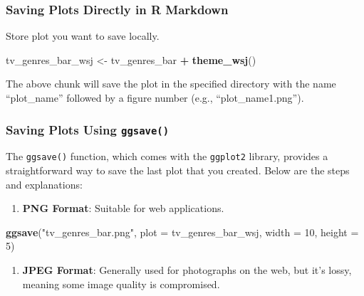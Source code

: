 \documentclass[
]{book}
\newenvironment{Shaded}{\begin{snugshade}}{\end{snugshade}}
\newcommand{\AttributeTok}[1]{\textcolor[rgb]{0.13,0.29,0.53}{#1}}
\newcommand{\DecValTok}[1]{\textcolor[rgb]{0.00,0.00,0.81}{#1}}
\newcommand{\FunctionTok}[1]{\textcolor[rgb]{0.13,0.29,0.53}{\textbf{#1}}}
\newcommand{\NormalTok}[1]{#1}
\newcommand{\OtherTok}[1]{\textcolor[rgb]{0.56,0.35,0.01}{#1}}
\newcommand{\SpecialCharTok}[1]{\textcolor[rgb]{0.81,0.36,0.00}{\textbf{#1}}}
\newcommand{\StringTok}[1]{\textcolor[rgb]{0.31,0.60,0.02}{#1}}
\providecommand{\tightlist}{%
  \setlength{\itemsep}{0pt}\setlength{\parskip}{0pt}}
\begin{document}
\hypertarget{saving-plots-directly-in-r-markdown}{%
\subsubsection*{Saving Plots Directly in R Markdown}\label{saving-plots-directly-in-r-markdown}}

Store plot you want to save locally.

\begin{Shaded}
\begin{Highlighting}[]
\NormalTok{tv\_genres\_bar\_wsj }\OtherTok{\textless{}{-}}\NormalTok{ tv\_genres\_bar }\SpecialCharTok{+}
  \FunctionTok{theme\_wsj}\NormalTok{()}
\end{Highlighting}
\end{Shaded}

The above chunk will save the plot in the specified directory with the name ``plot\_name'' followed by a figure number (e.g., ``plot\_name1.png'').

\hypertarget{saving-plots-using-ggsave}{%
\subsubsection*{\texorpdfstring{Saving Plots Using \texttt{ggsave()}}{Saving Plots Using ggsave()}}\label{saving-plots-using-ggsave}}

The \texttt{ggsave()} function, which comes with the \texttt{ggplot2} library, provides a straightforward way to save the last plot that you created. Below are the steps and explanations:

\begin{enumerate}
\def\labelenumi{\arabic{enumi}.}
\tightlist
\item
  \textbf{PNG Format}: Suitable for web applications.
\end{enumerate}

\begin{Shaded}
\begin{Highlighting}[]
\FunctionTok{ggsave}\NormalTok{(}\StringTok{"tv\_genres\_bar.png"}\NormalTok{, }\AttributeTok{plot =}\NormalTok{ tv\_genres\_bar\_wsj, }\AttributeTok{width =} \DecValTok{10}\NormalTok{, }\AttributeTok{height =} \DecValTok{5}\NormalTok{)}
\end{Highlighting}
\end{Shaded}

\begin{enumerate}
\def\labelenumi{\arabic{enumi}.}
\setcounter{enumi}{1}
\tightlist
\item
  \textbf{JPEG Format}: Generally used for photographs on the web, but it's lossy, meaning some image quality is compromised.
\end{enumerate}
\end{document}
